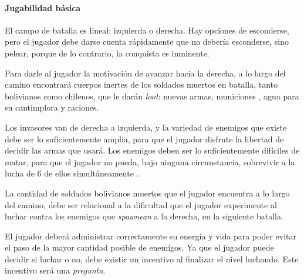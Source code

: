   \paragraph{Jugabilidad básica} El campo de batalla es lineal: izquierda o derecha. Hay opciones de esconderse, pero el jugador debe darse cuenta rápidamente que no debería esconderse, sino pelear, porque de lo contrario, la conquista es inminente.

  Para darle al jugador la motivación de avanzar hacia la derecha, a lo largo del camino encontrará cuerpos inertes de los soldados muertos en batalla, tanto bolivianos como chilenos, que le darán \textit{loot}: nuevas armas, municiones \talvez, agua para su cantimplora y raciones.

  Los invasores van de derecha a izquierda, y la variedad de enemigos que existe debe ser lo suficientemente amplia, para que el jugador disfrute la libertad de decidir las armas que usará. Los enemigos deben ser lo suficientemente difíciles de matar, para que el jugador no pueda, bajo ninguna circunstancia, sobrevivir a la lucha de 6 de ellos simultáneamente \indispensable.
  
  La cantidad de soldados bolivianos muertos que el jugador encuentra a lo largo del camino, debe ser relacional a la dificultad que el jugador experimente al luchar contra los enemigos que \textit{spawnean} a la derecha, en la siguiente batalla.
  
  El jugador deberá administrar correctamente su energía y vida para poder evitar el paso de la mayor cantidad posible de enemigos. Ya que el jugador puede decidir si luchar o no, debe existir un incentivo al finalizar el nivel luchando. Este incentivo será una \textit{pregunta}.
